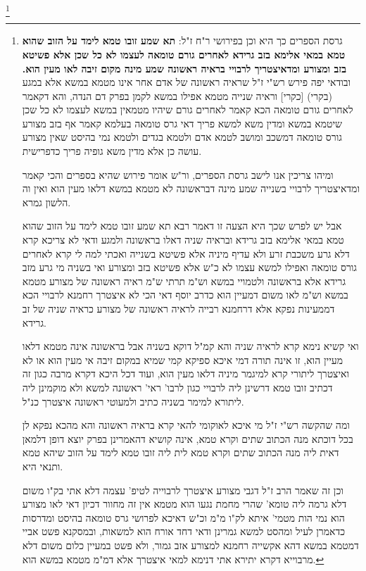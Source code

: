 \documentclass[12pt, openany]{book}
\newcommand{\footnotecomment}[1]{\footnote{#1}}
\newcommand{\commenta}[1]{\footnotecomment{#1}}
\begin{document}
{\commenta{גרסת הספרים כך היא וכן בפירושי ר"ח ז"ל: \textbf{תא שמע זובו טמא לימד על הזוב שהוא טמא במאי אלימא בזב גרידא לאחרים גורם טומאה לעצמו לא כל שכן אלא פשיטא בזב ומצורע ומדאיצטריך לרבויי בראיה ראשונה שמע מינה מקום זיבה לאו מעין הוא.}  ובודאי יפה פירש רש"י ז"ל שראיה ראשונה של אדם אחר אינו מטמא במשא אלא במגע (בקרי) [כקרי] וראיה שנייה מטמא אפילו במשא לקמן בפרק דם הנדה, והא דקאמר לאחרים גורם טומאה הכא קאמר לאחרים גורם שיהיו מטמאין במשא לעצמו לא כל שכן שיטמא במשא ומדין משא למשא פריך דאי גרס טומאה בעלמא קאמר אף בזב מצורע גורס טומאה דמשכב ומושב לטמא אדם ולטמא בגדים ולטמא נמי בהיסט שאין מצורע עושה כן אלא מדין משא גופיה פריך כדפרישית.\par  ומיהו צריכין אנו לישב גרסת הספרים, ור"ש אומר פירוש שהיא בספרים והכי קאמר ומדאיצטריך לרבויי בשנייה שמע מינה דבראשונה לא מטמא במשא דלאו מעין הוא ואין וה הלשון גמרא.\par  אבל יש לפרש שכך היא הצעה זו דאמר רבא תא שמע זובו טמא לימד על הזוב שהוא טמא במאי אלימא בזב גרידא ובראיה שניה דאלו בראשונה ולמגע ודאי לא צריכא קרא דלא גרע משכבת זרע ולא עדיף מיניה אלא פשיטא בשנייה ואכתי למה לי קרא לאחרים גורס טומאה ואפילו למשא עצמו לא כ"ש אלא פשיטא בזב ומצורע ואי בשניה מי גרע מזב גרידא אלא בראשונה ולטמויי במשא וש"מ תרתי ש"מ ראיה ראשונה של מצורע מטמא במשא וש"מ לאו משום דמעיין הוא כדרב יוסף דאי הכי לא איצטרך רחמנא לרבויי הכא דממעינות נפקא אלא דרחמנא רבייה לראיה ראשונה של מצורע כראיה שניה של זב גרידא.\par ואי קשיא נימא קרא לראיה שניה והא קמ"ל דוקא בשניה אבל בראשונה אינה מטמא דלאו מעיין הוא, זו אינה תורה דמי איכא ספיקא קמי שמיא במקום זיבה אי מעין הוא או לא ואיצטרך ליתורי קרא למיגמר מיניה דלאו מעין הוא, ועוד דכל היכא דקרא מרבה כגון זה דכתיב זובו טמא דרשינן ליה לרבויי כגון לרבו' ראי' ראשונה למשא ולא מוקמינן ליה ליתורא למימר בשניה כתיב ולמעוטי ראשונה איצטרך כנ"ל.\par ומה שהקשה רש"י ז"ל מי איכא לאוקומי להאי קרא בראיה ראשונה והא מהכא נפקא לן בכל דוכתא מנה הכתוב שתים וקרא טמא, אינה קושיא דהאמרינן בפרק יוצא דופן דלמאן דאית ליה מנה הכתוב שתים וקרא טמא לית ליה זובו טמא לימד על הזוב שיהא טמא ותנאי היא.\par וכן זה שאמר הרב ז"ל דגבי מצורע איצטרך לרבוייה לטיפ' עצמה דלא אתי בק"ו משום דלא גרמה ליה טומא' שהרי מחמת נגעו הוא מטמא אין זה מחוור דכיון דאי לאו מצורע הוא נמי הות מטמי' איתא לק"ו מ"מ וכ"ש דאיכא לפרושי גרס טומאה בהיסט ומדרסות כדאמרן לעיל ומהסט למשא גמרינן ודאי דחד אורח הוא למשאות, ובמסקנא פשט אביי דמטמא במשא דהא אקשייה רחמנא למצורע אזב גמור, ולא פשט במעיין כלום משום דלא מרבוייא דקרא יתירא אתי דנימא למאי איצטרך אלא דמ"מ מטמא במשא הוא. }

}
\end{document}
